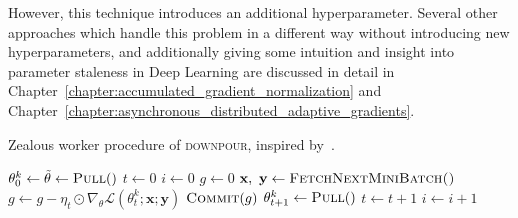 However, this technique introduces an additional hyperparameter. Several other approaches which handle this problem in a different way without introducing new hyperparameters, and additionally giving some intuition and insight into parameter staleness in Deep Learning are discussed in detail in Chapter~\ref{chapter:accumulated_gradient_normalization} and Chapter~\ref{chapter:asynchronous_distributed_adaptive_gradients}.

\begin{algorithm}[H]
  \caption{Zealous worker procedure of \textsc{downpour}, inspired by~\cite{louppe2010zealous}.}
  \label{algo:downpour_worker_zealous}
  \begin{algorithmic}[1]
    \State $\theta^k_0 \gets \tilde{\theta} \gets \Call{Pull}$
    \State $t \gets 0$
    \State $i \gets 0$
    \State $g \gets 0$
    \State $\textbf{x},~\textbf{y} \gets \Call{FetchNextMiniBatch()}{}$
    \State $g \gets g -\eta_t \odot \nabla_\theta \mathcal{L}(\theta^k_t;\textbf{x};\textbf{y})$
    \State $\Call{Commit}{g}$
    \State $\theta^k_{t + 1} \gets \Call{Pull}$
    \EndIf
    \State $t \gets t + 1$
    \State $i \gets i + 1$
    \EndWhile
    \EndWhile
    \EndProcedure
  \end{algorithmic}
\end{algorithm}


